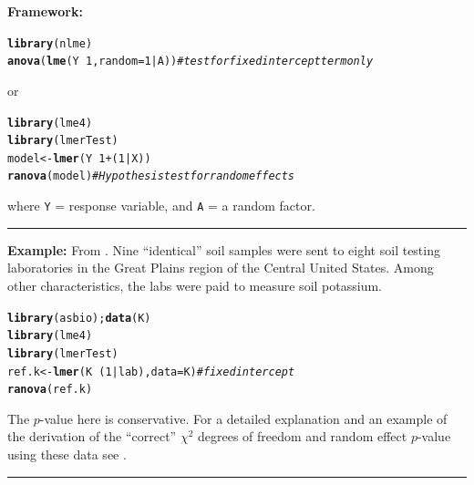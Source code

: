 \documentclass[12pt,english]{article}\usepackage[]{graphicx}\usepackage[table]{xcolor}
\makeatletter
\newcommand{\hlnum}[1]{\textcolor[rgb]{0.686,0.059,0.569}{#1}}%
\newcommand{\hlcom}[1]{\textcolor[rgb]{0.678,0.584,0.686}{\textit{#1}}}%
\newcommand{\hlopt}[1]{\textcolor[rgb]{0,0,0}{#1}}%
\newcommand{\hldef}[1]{\textcolor[rgb]{0.345,0.345,0.345}{#1}}%
\newcommand{\hlkwb}[1]{\textcolor[rgb]{0.69,0.353,0.396}{#1}}%
\newcommand{\hlkwc}[1]{\textcolor[rgb]{0.333,0.667,0.333}{#1}}%
\newcommand{\hlkwd}[1]{\textcolor[rgb]{0.737,0.353,0.396}{\textbf{#1}}}%
\newenvironment{kframe}{%
 \def\at@end@of@kframe{}%
 \ifinner\ifhmode%
  \def\at@end@of@kframe{\end{minipage}}%
  \begin{minipage}{\columnwidth}%
 \fi\fi%
 \def\FrameCommand##1{\hskip\@totalleftmargin \hskip-\fboxsep
 \colorbox{shadecolor}{##1}\hskip-\fboxsep
     \hskip-\linewidth \hskip-\@totalleftmargin \hskip\columnwidth}%
 \MakeFramed {\advance\hsize-\width
   \@totalleftmargin\z@ \linewidth\hsize
   \@setminipage}}%
 {\par\unskip\endMakeFramed%
 \at@end@of@kframe}
\newenvironment{knitrout}{}{} %
\makeatother
\begin{document}
\begin{tcolorbox}[colback=yellow!50!red!25!white,colbacktitle=yellow!50!red,colframe=black!75!white,title=\textbf{R:} One Way ANOVA - Random Effects]
\textbf{Framework:}\\
\vspace{-.15in}
\begin{knitrout}
\color{fgcolor}\begin{kframe}
\begin{alltt}
\hlkwd{library}\hldef{(nlme)}
\hlkwd{anova}\hldef{(}\hlkwd{lme}\hldef{(Y} \hlopt{~} \hlnum{1}\hldef{,} \hlkwc{random} \hldef{=} \hlnum{1}\hlopt{|}\hldef{A))} \hlcom{# test for fixed intercept term only}
\end{alltt}
\end{kframe}
\end{knitrout}
\vspace{-.1in}
or
\vspace{-.1in}
\begin{knitrout}
\color{fgcolor}\begin{kframe}
\begin{alltt}
\hlkwd{library}\hldef{(lme4)}
\hlkwd{library}\hldef{(lmerTest)}
\hldef{model} \hlkwb{<-} \hlkwd{lmer}\hldef{(Y} \hlopt{~} \hlnum{1} \hlopt{+} \hldef{(}\hlnum{1}\hlopt{|}\hldef{X))}
\hlkwd{ranova}\hldef{(model)}  \hlcom{# Hypothesis test for random effects}
\end{alltt}
\end{kframe}
\end{knitrout}
where \texttt{Y} = response variable, and \texttt{A} = a random factor.
\vspace{0.1in}
\par\noindent\rule{.9\textwidth}{0.4pt}

\textbf{Example:} From \citep[][pg 450]{aho2014}.  Nine ``identical'' soil samples were sent to eight soil testing laboratories in the Great Plains region of the Central United States. Among other characteristics, the labs were paid to measure soil potassium.
\vspace{-.1in}
\begin{knitrout}
\color{fgcolor}\begin{kframe}
\begin{alltt}
\hlkwd{library}\hldef{(asbio);} \hlkwd{data}\hldef{(K)}
\hlkwd{library}\hldef{(lme4)}
\hlkwd{library}\hldef{(lmerTest)}
\hldef{ref.k} \hlkwb{<-} \hlkwd{lmer}\hldef{(K} \hlopt{~} \hldef{(}\hlnum{1}\hlopt{|}\hldef{lab),} \hlkwc{data} \hldef{= K)} \hlcom{# fixed intercept}
\hlkwd{ranova}\hldef{(ref.k)}
\end{alltt}
\end{kframe}
\end{knitrout}
\vspace{-.1in}
The $p$-value here is conservative.  For a detailed explanation and an example of the derivation of the ``correct'' $\chi^2$ degrees of freedom and random effect $p$-value using these data see \citet{aho2014}.
\end{tcolorbox}
\par\noindent\rule{.9\textwidth}{0.4pt}
\newpage
\end{document}
